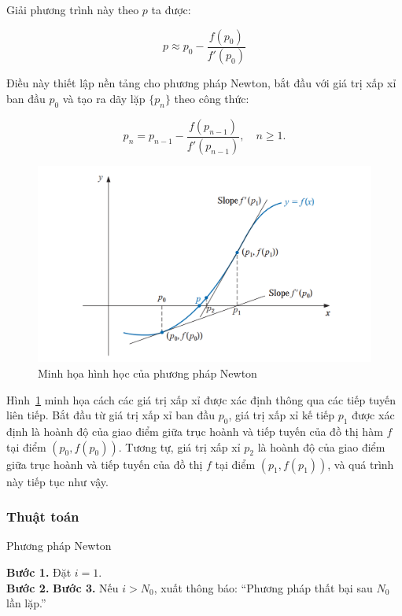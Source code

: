 Giải phương trình này theo $p$ ta được:

$$p \approx p_0 - \frac{f(p_0)}{f'(p_0)}$$

Điều này thiết lập nền tảng cho phương pháp Newton, bắt đầu với giá trị xấp xỉ ban đầu $p_0$ và tạo ra dãy lặp $\{p_n\}$ theo công thức:

$$p_n = p_{n-1} - \frac{f(p_{n-1})}{f'(p_{n-1})},\quad n \geq 1.$$

\begin{figure}[H]
    \centering
    \includegraphics[width=1\linewidth]{figures/newton method.png}
    \caption{Minh họa hình học của phương pháp Newton}
    \label{fig:placeholder}
\end{figure}

Hình~\ref{fig:placeholder} minh họa cách các giá trị xấp xỉ được xác định thông qua các tiếp tuyến liên tiếp. 
Bắt đầu từ giá trị xấp xỉ ban đầu $p_0$, giá trị xấp xỉ kế tiếp $p_1$ được xác định là hoành độ của giao điểm giữa trục hoành và tiếp tuyến của đồ thị hàm $f$ tại điểm $(p_0, f(p_0))$. Tương tự, giá trị xấp xỉ $p_2$ là hoành độ của giao điểm giữa trục hoành và tiếp tuyến của đồ thị $f$ tại điểm $(p_1, f(p_1))$, và quá trình này tiếp tục như vậy. 

\subsubsection*{Thuật toán}

\begin{algorithm}[H]
\caption{Phương pháp Newton}
\label{alg:newton}
\SetAlgoLined
{}

\BlankLine
\textbf{Bước 1.} Đặt $i = 1$. \\
\textbf{Bước 2.} 
\textbf{Bước 3.} Nếu $i > N_0$, xuất thông báo: “Phương pháp thất bại sau $N_0$ lần lặp.”
\end{algorithm}

